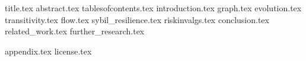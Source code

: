 \documentclass[11pt]{llncs}
\begin{document}
  {title.tex}
  \thispagestyle{plain}
  {abstract.tex}
  \clearpage
  {tablesofcontents.tex}
  {introduction.tex}
  {graph.tex}
  {evolution.tex}
  {transitivity.tex}
  {flow.tex}
  {sybil_resilience.tex}
  {riskinvalgs.tex}
  {conclusion.tex}
  {related_work.tex}
  {further_research.tex}
  
  \newpage
  {appendix.tex}
  \newpage
  {license.tex}
\end{document}
